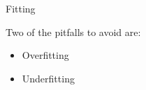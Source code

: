 \documentclass[11pt]{beamer}
\begin{document}
\begin{frame}{
\begin{minipage}[t]{0.55\textwidth}
	Fitting
\end{minipage}
\hfill
\begin{minipage}[t]{0.35\textwidth}
	\flushright
\end{minipage}
}{}
Two of the pitfalls to avoid are:
\begin{itemize}
	\item Overfitting
	\item Underfitting
\end{itemize}
\begin{center}
\end{center}

\end{frame}
\end{document}
